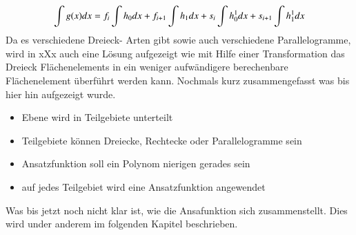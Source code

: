 \begin{equation}
\int g(x) \space dx = f_i \int h_0 \space dx+ f_{i+1}\int h_1 \space dx + s_i\int h_0^1 dx + s_{i+1}\int h_1^1 dx
\label{fem:equation5}
\end{equation}
Da es verschiedene Dreieck- Arten gibt sowie auch verschiedene Parallelogramme, wird in xXx auch eine Lösung aufgezeigt wie mit Hilfe einer Transformation das Dreieck Flächenelements in ein weniger aufwändigere berechenbare Flächenelement überführt werden kann.
Nochmals kurz zusammengefasst was bis hier hin aufgezeigt wurde.
\begin{itemize}
	\item Ebene wird in Teilgebiete unterteilt
	\item Teilgebiete können Dreiecke, Rechtecke oder Parallelogramme sein
	\item Ansatzfunktion soll ein Polynom nierigen gerades sein
	\item auf jedes Teilgebiet wird eine Ansatzfunktion angewendet
\end{itemize} 
Was bis jetzt noch nicht klar ist, wie die Ansafunktion sich zusammenstellt. Dies wird under anderem im folgenden Kapitel beschrieben.





